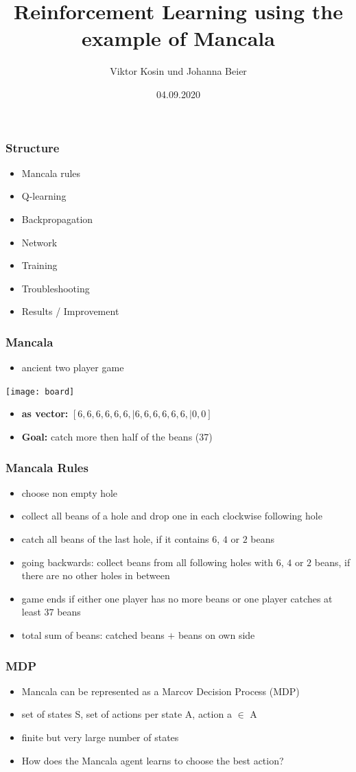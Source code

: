 \documentclass{beamer}
\title{Reinforcement Learning using the example of Mancala}
\author{Viktor Kosin und Johanna Beier}
\date{04.09.2020}
\begin{document}
\frame{\titlepage}

\begin{frame}
\frametitle{Structure}
\begin{itemize}
\item Mancala rules
\item Q-learning
\item Backpropagation
\item Network
\item Training
\item Troubleshooting
\item Results / Improvement
\end{itemize}
\end{frame}

\begin{frame}
\frametitle{Mancala}
\begin{itemize}
\item ancient two player game
\end{itemize}
\texttt{[image: board]}
\begin{itemize}
\item \textbf{as vector:} $[6,6,6,6,6,6, | 6,6,6,6,6,6, |0,0]$
\item\textbf{Goal:} catch more then half of the beans (37) 
\end{itemize}
\end{frame}

\begin{frame}
\frametitle{Mancala Rules}
\begin{itemize}
\item choose non empty hole
\item collect all beans of a hole and drop one in each clockwise following hole
\item catch all beans of the last hole, if it contains $6$, $4$ or $2$ beans
\item going backwards: collect beans from all following holes with $6$, $4$ or $2$ beans, if there are no other holes in between
\item game ends if either one player has no more beans or one player catches at least $37$ beans
\item total sum of beans: catched beans $+$ beans on own side
\end{itemize}
\end{frame}

\begin{frame}
 \frametitle{MDP}
 \begin{itemize}
 \item Mancala can be represented as a Marcov Decision Process (MDP) 
 \item set of states S, set of actions per state A, action a $\in$ A
\item finite but very large number of states
 \item How does the Mancala agent learns to choose the best action?
 \end{itemize}
 \end{frame}
\end{document}
